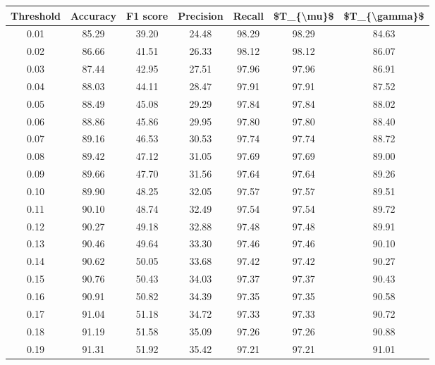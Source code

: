 \begin{tabular}{|c|c|c|c|c|c|c|}
\hline
 Threshold &  Accuracy &  F1 score &  Precision &  Recall &  \$T\_\{\textbackslash mu\}\$ &  \$T\_\{\textbackslash gamma\}\$ \\
\hline
      0.01 &     85.29 &     39.20 &      24.48 &   98.29 &      98.29 &         84.63 \\
      0.02 &     86.66 &     41.51 &      26.33 &   98.12 &      98.12 &         86.07 \\
      0.03 &     87.44 &     42.95 &      27.51 &   97.96 &      97.96 &         86.91 \\
      0.04 &     88.03 &     44.11 &      28.47 &   97.91 &      97.91 &         87.52 \\
      0.05 &     88.49 &     45.08 &      29.29 &   97.84 &      97.84 &         88.02 \\
      0.06 &     88.86 &     45.86 &      29.95 &   97.80 &      97.80 &         88.40 \\
      0.07 &     89.16 &     46.53 &      30.53 &   97.74 &      97.74 &         88.72 \\
      0.08 &     89.42 &     47.12 &      31.05 &   97.69 &      97.69 &         89.00 \\
      0.09 &     89.66 &     47.70 &      31.56 &   97.64 &      97.64 &         89.26 \\
      0.10 &     89.90 &     48.25 &      32.05 &   97.57 &      97.57 &         89.51 \\
      0.11 &     90.10 &     48.74 &      32.49 &   97.54 &      97.54 &         89.72 \\
      0.12 &     90.27 &     49.18 &      32.88 &   97.48 &      97.48 &         89.91 \\
      0.13 &     90.46 &     49.64 &      33.30 &   97.46 &      97.46 &         90.10 \\
      0.14 &     90.62 &     50.05 &      33.68 &   97.42 &      97.42 &         90.27 \\
      0.15 &     90.76 &     50.43 &      34.03 &   97.37 &      97.37 &         90.43 \\
      0.16 &     90.91 &     50.82 &      34.39 &   97.35 &      97.35 &         90.58 \\
      0.17 &     91.04 &     51.18 &      34.72 &   97.33 &      97.33 &         90.72 \\
      0.18 &     91.19 &     51.58 &      35.09 &   97.26 &      97.26 &         90.88 \\
      0.19 &     91.31 &     51.92 &      35.42 &   97.21 &      97.21 &         91.01 \\

\end{tabular}
